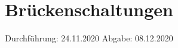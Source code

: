 

\subject{V302}
\title{Brückenschaltungen}
\date{%
  Durchführung: 24.11.2020
  \hspace{3em}
  Abgabe: 08.12.2020
}



\maketitle
\thispagestyle{empty}
\tableofcontents
\newpage







\printbibliography{}


